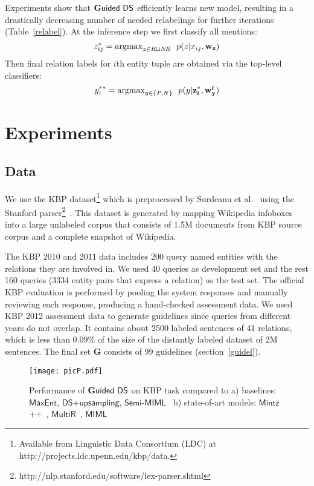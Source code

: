 \documentclass[11pt]{article}
\begin{document}
Experiments show that $\mathsf{{\bf G}uided\ DS}$
efficiently learns new model, 
resulting in a drastically decreasing 
number of needed relabelings for further iterations (Table~\ref{relabel}).
At the inference step we first classify all mentions: 
$$z_{ij}^*={\rm argmax}_{z\in R\cup N\!R} \ \ p(z | x_{ij}, {\bf w_z})$$
Then final relation labels for $i$th entity tuple are obtained via the top-level classifiers:
$$y_i^{r*} = {\rm argmax}_{y\in \{P,N\} } \ \ p(y |{\bf z_i^*, w_y^r})$$


\section{Experiments}
\label{exp}

\subsection{Data}
We use the KBP \cite{ji11} 
dataset\footnote{Available from Linguistic Data Consortium (LDC) at http://projects.ldc.upenn.edu/kbp/data.} 
which is preprocessed by Surdeanu et al.~ using the Stanford parser\footnote{http://nlp.stanford.edu/software/lex-parser.shtml}~\cite{klein03}. 
This dataset is generated by mapping Wikipedia 
 infoboxes into a large unlabeled corpus that consists of 1.5M documents from KBP source corpus and a complete snapshot of Wikipedia. 

The KBP 2010 and 2011 data includes 200 query named entities with the relations they are involved in. 
We used 40 queries as development set and the rest 160 queries (3334 entity pairs that express a relation) as the test set.
The official KBP evaluation is performed by pooling the system responses and manually reviewing each response,
 producing a hand-checked assessment data. We used KBP  2012 assessment data to generate guidelines since
queries from different years do not overlap. It contains about 2500
labeled sentences of 41 relations, which
is less than 0.09\% of the size of the distantly labeled dataset of 2M sentences.
The final set {\bf G} consists of 99 guidelines (section~\ref{guidel}).

 \captionsetup{belowskip=-15pt,aboveskip=3pt}
\begin{figure*}[ht!]
\texttt{[image: picP.pdf]}
\caption{Performance of $\mathsf{{\bf G}uided\ DS}$ on KBP task compared to a) baselines: 
$\mathsf{MaxEnt}$, $\mathsf{DS}$+$\mathsf{upsampling}$, $\mathsf{Semi}$-$\mathsf{MIML}$~\cite{min13}
b) state-of-art models: $\mathsf{Mintz}$++~\cite{mintz09}, $\mathsf{MultiR}$~\cite{hoffmann11}, $\mathsf{MIML}$~\cite{surdeanu12}}
\label{plots}
\end{figure*}
\end{document}
